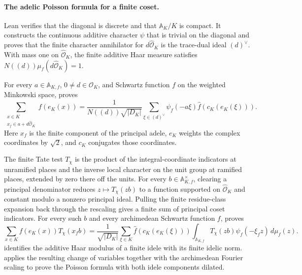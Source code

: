 \documentclass[11pt]{amsart}
\theoremstyle{definition}
\theoremstyle{remark}
\numberwithin{equation}{section}
\begin{document}
\paragraph{The adelic Poisson formula for a finite coset.}
Lean verifies that the diagonal is discrete and that
$\mathbb A_K/K$ is compact. It constructs the continuous additive
character $\psi$ that is trivial on the diagonal and proves that the
finite character annihilator for $d\widehat{\mathcal O}_K$ is the
trace-dual ideal $(d)^\vee$. With mass one on
$\widehat{\mathcal O}_K$, the finite additive Haar measure satisfies
$N((d))\mu_f(d\widehat{\mathcal O}_K)=1$.

For every $a\in\mathbb A_{K,f}$, $0\ne d\in\mathcal O_K$, and Schwartz
function $f$ on the weighted Minkowski space,
 proves
\[
  \sum_{\substack{x\in K\\ x_f\in a+d\widehat{\mathcal O}_K}} f(e_K(x))
  =
  \frac{1}{N((d))\sqrt{|D_K|}}
  \sum_{\xi\in(d)^\vee} \psi_f(-a\xi)\widehat f(c_K(e_K(\xi))).
\]
Here $x_f$ is the finite component of the principal adele, $e_K$ weights
the complex coordinates by $\sqrt{2}$, and $c_K$ conjugates those coordinates.

The finite Tate test $T_\chi$ is the product of the integral-coordinate
indicators at unramified places and the inverse local character on the unit
group at ramified places, extended by zero there off the units.
For every $b\in\mathbb A_{K,f}^{\times}$, clearing a principal denominator
reduces $z\mapsto T_\chi(zb)$ to a function supported on
$\widehat{\mathcal O}_K$ and constant modulo a nonzero principal ideal.
Pulling the finite residue-class expansion back through the rescaling
gives a finite sum of principal coset indicators.
For every such $b$ and every archimedean Schwartz function $f$,
 proves
\[
  \sum_{x\in K} f(e_K(x))T_\chi(x_f b)
  = \frac{1}{\sqrt{|D_K|}}\sum_{\xi\in K}
    \widehat f(c_K(e_K(\xi)))
    \int_{\mathbb A_{K,f}} T_\chi(zb)\psi_f(-\xi_f z)\,d\mu_f(z).
\]
 identifies the
additive Haar modulus of a finite idele with its finite idelic norm.
 applies the resulting
change of variables together with the archimedean Fourier scaling
to prove the Poisson formula with both idele components dilated.
\end{document}

